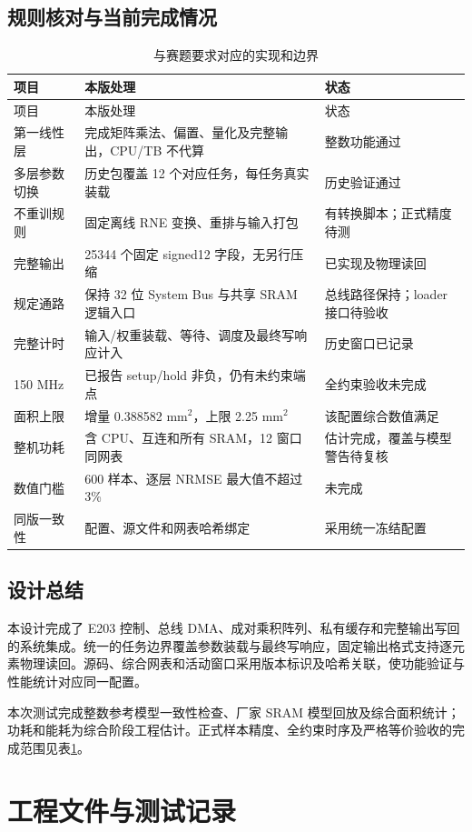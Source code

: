 \documentclass[UTF8,punct,fontset=none,zihao=-4]{ctexart}
\begin{document}
\subsection{规则核对与当前完成情况}
\begin{longtable}{p{26mm}p{82mm}p{37mm}}
\caption{与赛题要求对应的实现和边界}\label{tab:rules}\\
\toprule 项目 & 本版处理 & 状态\\\midrule\endfirsthead
\toprule 项目 & 本版处理 & 状态\\\midrule\endhead
第一线性层 & 完成矩阵乘法、偏置、量化及完整输出，CPU/TB 不代算 & 整数功能通过\\
多层参数切换 & 历史包覆盖 12 个对应任务，每任务真实装载 & 历史验证通过\\
不重训规则 & 固定离线 RNE 变换、重排与输入打包 & 有转换脚本；正式精度待测\\
完整输出 & 25344 个固定 signed12 字段，无另行压缩 & 已实现及物理读回\\
规定通路 & 保持 32 位 System Bus 与共享 SRAM 逻辑入口 & 总线路径保持；loader 接口待验收\\
完整计时 & 输入/权重装载、等待、调度及最终写响应计入 & 历史窗口已记录\\
150 MHz & 已报告 setup/hold 非负，仍有未约束端点 & 全约束验收未完成\\
面积上限 & 增量 0.388582 mm$^2$，上限 2.25 mm$^2$ & 该配置综合数值满足\\
整机功耗 & 含 CPU、互连和所有 SRAM，12 窗口同网表 & 估计完成，覆盖与模型警告待复核\\
数值门槛 & 600 样本、逐层 NRMSE 最大值不超过 3\% & 未完成\\
同版一致性 & 配置、源文件和网表哈希绑定 & 采用统一冻结配置\\
\bottomrule
\end{longtable}

\subsection{设计总结}
本设计完成了 E203 控制、总线 DMA、成对乘积阵列、私有缓存和完整输出写回的系统集成。统一的任务边界覆盖参数装载与最终写响应，固定输出格式支持逐元素物理读回。源码、综合网表和活动窗口采用版本标识及哈希关联，使功能验证与性能统计对应同一配置。

本次测试完成整数参考模型一致性检查、厂家 SRAM 模型回放及综合面积统计；功耗和能耗为综合阶段工程估计。正式样本精度、全约束时序及严格等价验收的完成范围见表\ref{tab:rules}。

\section{工程文件与测试记录}
\end{document}
